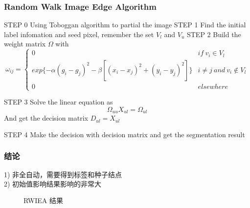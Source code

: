 \documentclass[notheorems, UTF8]{beamer}
\theoremstyle{plain}
\begin{document}
\begin{frame}
\frametitle{Random Walk Image Edge Algorithm}
\begin{algorithm}[H]
\begin{algorithmic}
\State STEP 0 Using Toboggan algorithm to partial the image
\State STEP 1 Find the initial label infomation and seed pixel, remember the set $V_l$ and $V_u$
\State STEP 2 Build the weight matrix $\Omega$ with
\begin{displaymath}
\omega_{ij} = \left\{
\begin{array}{ll}
0 & if\ v_i \in V_l\\
exp\{-\alpha(g_i - g_j)^2 -\beta[(x_i-x_j)^2 + (y_i-y_j)^2 ]\}  &  i \neq j\ and\ v_i \not\in V_l\\
0 & elsewhere
\end{array}
\right .
\end{displaymath}

\State STEP 3 Solve the linear equation as 
\begin{displaymath}
\Omega_{uu}X_{ul} = \Omega_{ul}
\end{displaymath}
And get the decision matrix $D_{ul} = X_{ul}$

\State STEP 4 Make the decision with decision matrix and get the segmentation result

\end{algorithmic}
\end{algorithm}
\end{frame}




\begin{frame}
\frametitle{结论}
1) 非全自动，需要得到标签和种子结点\\
2) 初始值影响结果影响的非常大\\
\begin{figure}[H]
\centering
{}
\caption{RWIEA 结果} \label{fig:1}
\end{figure}

\end{frame}
\end{document}
